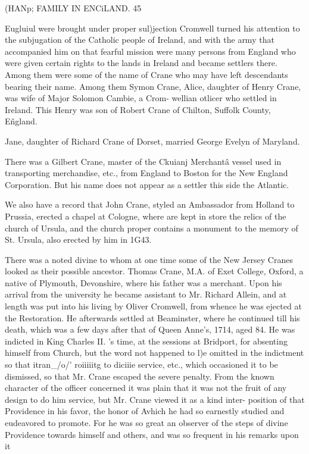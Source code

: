 \documentclass{book}
\begin{document}
(HANp; FAMILY IN ENCiLAND. 45 

Eugluiul were brought under proper sul)jection Cromwell turned 
his attention to the subjugation of the Catholic people of Ireland, 
and with the army that accompanied him on that fearful mission 
were many persons from England who were given certain rights 
to the lands in Ireland and became settlers there. Among them 
were some of the name of Crane who may have left descendants 
bearing their name. Among them Symon Crane, Alice, daughter 
of Henry Crane, was wife of Major Solomon Cambie, a Crom- 
wellian otlicer who settled in Ireland. This Henry was son of 
Robert Crane of Chilton, Suffolk County, E\^ngland. 

Jane, daughter of Richard Crane of Dorset, married George 
Evelyn of Maryland. 

There was a Gilbert Crane, master of the Ckuianj Merchant\^ 
a vessel used in transporting merchandise, etc., from England to 
Boston for the New England Corporation. But his name does 
not appear as a settler this side the Atlantic. 

We also have a record that John Crane, styled an Ambassador 
from Holland to Prussia, erected a chapel at Cologne, where are 
kept in store the relics of the church of Ursula, and the church 
proper contains a monument to the memory of St. Ursula, also 
erected by him in 1G43. 

There was a noted divine to whom at one time some of the 
New Jersey Cranes looked as their possible ancestor. Thomas 
Crane, M.A. of Exet College, Oxford, a native of Plymouth, 
Devonshire, where his father was a merchant. Upon his arrival 
from the university he became assistant to Mr. Richard Allein, 
and at length was put into his living by Oliver Cromwell, from 
whence he was ejected at the Restoration. He afterwards settled 
at Beaminster, where he continued till his death, which was a few 
days after that of Queen Anne's, 1714, aged 84. He was 
indicted in King Charles II. 's time, at the sessions at Bridport, 
for absenting himself from Church, but the word not happened to 
l)e omitted in the indictment so that itran\_/o/' roiiiiitg to diciiie 
service, etc., which occasioned it to be dismissed, so that Mr. 
Crane escaped the severe penalty. From the known character of 
the officer concerned it was plain that it was not the fruit of any 
design to do him service, but Mr. Crane viewed it as a kind inter- 
position of that Providence in his favor, the honor of Avhich he 
had so earnestly studied and eudeavored to promote. For he 
was so great an observer of the steps of divine Providence towards 
himself and others, and was so frequent in his remarks upon it 
\end{document}
